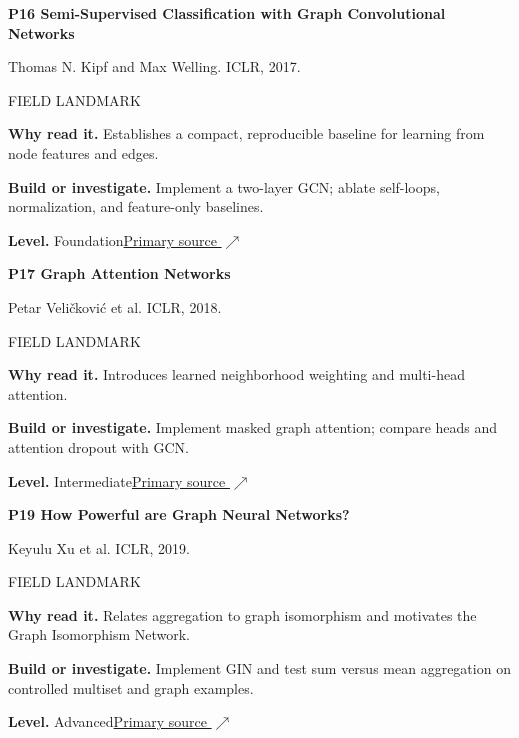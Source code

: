 \documentclass[11pt,letterpaper]{article}
\begin{document}
\begin{minipage}{\linewidth}
{\large\bfseries P16 Semi-Supervised Classification with Graph Convolutional Networks}\par
Thomas N. Kipf and Max Welling. ICLR, 2017.\par
\textcolor{ink}{\small FIELD LANDMARK}\par
\textbf{Why read it.} Establishes a compact, reproducible baseline for learning from node features and edges.\par
\textbf{Build or investigate.} Implement a two-layer GCN; ablate self-loops, normalization, and feature-only baselines.\par
\textbf{Level.} Foundation\quad\href{https://arxiv.org/abs/1609.02907}{Primary source $\nearrow$}\par
\end{minipage}\par\vspace{10pt}
\begin{minipage}{\linewidth}
{\large\bfseries P17 Graph Attention Networks}\par
Petar Veli\v{c}kovi\'c et al. ICLR, 2018.\par
\textcolor{ink}{\small FIELD LANDMARK}\par
\textbf{Why read it.} Introduces learned neighborhood weighting and multi-head attention.\par
\textbf{Build or investigate.} Implement masked graph attention; compare heads and attention dropout with GCN.\par
\textbf{Level.} Intermediate\quad\href{https://arxiv.org/abs/1710.10903}{Primary source $\nearrow$}\par
\end{minipage}\par\vspace{10pt}
\begin{minipage}{\linewidth}
{\large\bfseries P19 How Powerful are Graph Neural Networks?}\par
Keyulu Xu et al. ICLR, 2019.\par
\textcolor{ink}{\small FIELD LANDMARK}\par
\textbf{Why read it.} Relates aggregation to graph isomorphism and motivates the Graph Isomorphism Network.\par
\textbf{Build or investigate.} Implement GIN and test sum versus mean aggregation on controlled multiset and graph examples.\par
\textbf{Level.} Advanced\quad\href{https://arxiv.org/abs/1810.00826}{Primary source $\nearrow$}\par
\end{minipage}\par\vspace{10pt}
\end{document}
